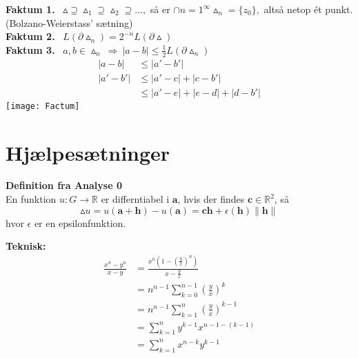 \documentclass[10pt,a4paper]{article}
\theoremstyle{definition}
\begin{document}
\newpage
\begin{framed}
\textbf{Faktum 1.} \ $\vartriangle \supseteq \vartriangle_1 \supseteq \vartriangle_2 \supseteq ...,$ så er $\cap{n=1}^\infty \vartriangle_n = \{z_0\},$ altså netop ét punkt. (Bolzano-Weierstass' sætning) \\

\textbf{Faktum 2.} \ $L(\partial \vartriangle_n) = 2^{-n} L (\partial \vartriangle)$ \\

\textbf{Faktum 3.} \ $a,b \in \vartriangle_n \ \Rightarrow \ \left| a-b \right| \leq \frac{1}{2} L (\partial \vartriangle_n)$
\begin{align*}
\left| a-b \right| &\leq \left| a' - b' \right| \\
\left| a' - b' \right| &\leq \left| a'-c \right| + \left| c - b' \right| \\
&\leq \left| a' - e \right| + \left| e-d \right| + \left| d-b' \right|
\end{align*}
\texttt{[image: Factum]}
\end{framed}





\newpage
\section{Hjælpesætninger}
\begin{framed}
\textbf{Definition fra Analyse 0} \\
En funktion $u : G \rightarrow \mathbb{R}$ er differntiabel i $\textbf{a}$, hvis der findes $\textbf{c} \in \mathbb{R}^2$, så 
$$\vartriangle u = u ( \textbf{a} + \textbf{h}) - u (\textbf{a}) = \textbf{c} \textbf{h} + \epsilon (\textbf{h}) \parallel \textbf{h} \parallel$$
hvor $\epsilon$ er en epsilonfunktion.
\end{framed}

\begin{framed}
\textbf{Teknisk:} \\
\begin{align*}
\frac{x^n - y^n}{x-y} &= \frac{x^n(1 - (\frac{y}{x})^n)}{x - \frac{y}{x}} \\
&= n^{n-1} \sum\limits_{k=0}^{n-1} (\frac{y}{x})^k \\
&= n^{n-1} \sum\limits_{k=1}^n (\frac{y}{x})^{k-1} \\
&= \sum\limits_{k=1}^n y^{k-1} x^{n-1 - (k-1)} \\
&= \sum\limits_{k=1}^n x^{n-k} y^{k-1}
\end{align*}
\end{framed}
\end{document}
